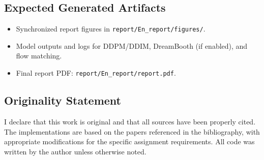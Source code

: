 \documentclass[a4paper,12pt]{article}
\begin{document}
\subsection{Expected Generated Artifacts}
\begin{itemize}
    \item Synchronized report figures in \texttt{report/En\_report/figures/}.
    \item Model outputs and logs for DDPM/DDIM, DreamBooth (if enabled), and flow matching.
    \item Final report PDF: \texttt{report/En\_report/report.pdf}.
\end{itemize}

\subsection{Originality Statement}

I declare that this work is original and that all sources have been properly cited. The implementations are based on the papers referenced in the bibliography, with appropriate modifications for the specific assignment requirements. All code was written by the author unless otherwise noted.

\clearpage
\end{document}
